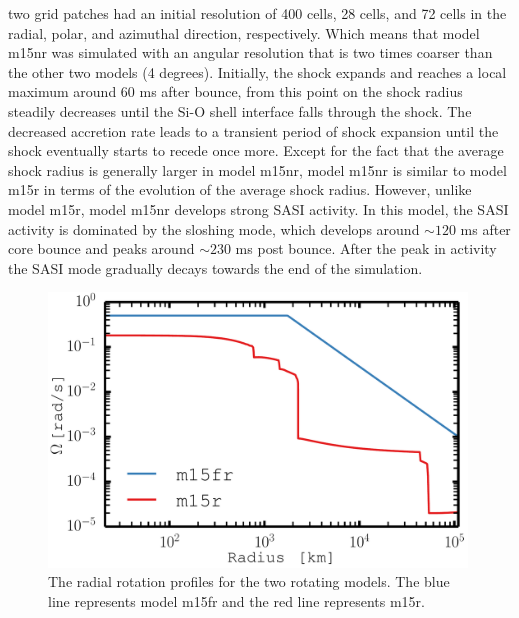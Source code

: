 \begin{itemize}
two grid patches had an initial resolution of 400 cells, 28 cells, and 72 cells in the radial, polar, and
azimuthal direction, respectively. Which means that model m15nr was simulated with an angular resolution that is
two times coarser than the other two models (4 degrees). Initially, the shock expands and reaches a local maximum around $60$ ms after bounce,
from this point on the shock radius steadily decreases until the Si-O shell interface falls through the shock. The decreased accretion rate
leads to a transient period of shock expansion until the shock eventually starts to recede once more. Except for the fact that
the average shock radius is generally larger in model m15nr, model m15nr is similar to model m15r in terms of the evolution of the average shock
radius. However, unlike model m15r, model m15nr develops strong SASI activity. In this model, the SASI activity is dominated by the sloshing mode,
which develops around $\sim 120$ ms after core bounce and peaks around $\sim 230$ ms post bounce. After the peak in activity 
the SASI mode gradually decays towards the end of the simulation.   
\end{itemize}
\begin{figure}[ht]           
\centering                            
\includegraphics[width=0.99\textwidth]{./images/paper2/rot.pdf}
\caption{The radial rotation profiles for the two rotating models. The blue line represents model 
m15fr and the red line represents m15r. \label{figp2:rot}}
\end{figure}
